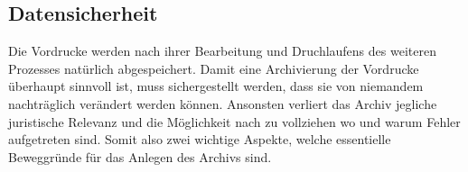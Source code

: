\subsection{Datensicherheit}
Die Vordrucke werden nach ihrer Bearbeitung und Druchlaufens des weiteren Prozesses natürlich abgespeichert.
Damit eine Archivierung der Vordrucke überhaupt sinnvoll ist, muss sichergestellt werden, dass sie von niemandem  
nachträglich verändert werden können. Ansonsten verliert das Archiv jegliche juristische Relevanz und die Möglichkeit nach zu vollziehen wo und warum Fehler aufgetreten sind. Somit also zwei wichtige Aspekte, welche essentielle Beweggründe für das Anlegen des Archivs sind.   
